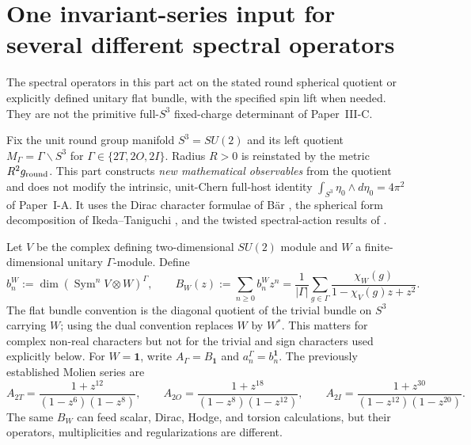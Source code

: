 \documentclass[11pt]{article}
\begin{document}
\section{One invariant-series input for several different spectral operators}
The spectral operators in this part act on the stated round spherical quotient
or explicitly defined unitary flat bundle, with the specified spin lift when
needed.  They are not the primitive full-$S^3$ fixed-charge determinant of
Paper~III-C.
\label{p1b:sec:v13-owners}

Fix the unit round group manifold $S^3=SU(2)$ and its left quotient
$M_\Gamma=\Gamma\backslash S^3$ for
$\Gamma\in\{2T,2O,2I\}$.  Radius $R>0$ is reinstated by the metric
$R^2g_{\rm round}$.  This part constructs \emph{new mathematical
observables} from the quotient and does not modify the intrinsic,
unit-Chern full-host identity
$\int_{S^3}\eta_0\wedge d\eta_0=4\pi^2$ of Paper~I-A.
It uses the Dirac character formulae of B\"ar
\cite{Baer1996DiracSpaceForms,Baer2000SpinStructure}, the spherical
form decomposition of Ikeda--Taniguchi
\cite{ikedaTaniguchi1978eigenforms}, and the twisted spectral-action
results of \cite{CacicMarcolliTeh2014CosmicTopology}.

Let $V$ be the complex defining two-dimensional $SU(2)$ module and
$W$ a finite-dimensional unitary $\Gamma$-module. Define
\begin{equation}
\label{p1b:eq:v13-isotypic-series}
 b_n^W:=\dim(\operatorname{Sym}^n V\otimes W)^\Gamma,
 \qquad B_W(z):=\sum_{n\geq0}b_n^Wz^n
 =\frac1{|\Gamma|}\sum_{g\in\Gamma}
 \frac{\chi_W(g)}{1-\chi_V(g)z+z^2}.
\end{equation}
The flat bundle convention is the diagonal quotient of the trivial
bundle on $S^3$ carrying $W$; using the dual convention replaces $W$
by $W^*$.  This matters for complex non-real characters but not for the
trivial and sign characters used explicitly below.  For $W=\mathbf1$,
write $A_\Gamma=B_{\mathbf1}$ and $a_n^\Gamma=b_n^{\mathbf1}$.
The previously established Molien series are
\begin{equation}
\label{p1b:eq:v13-molien-three}
 A_{2T}=\frac{1+z^{12}}{(1-z^6)(1-z^8)},\qquad
 A_{2O}=\frac{1+z^{18}}{(1-z^8)(1-z^{12})},\qquad
 A_{2I}=\frac{1+z^{30}}{(1-z^{12})(1-z^{20})}.
\end{equation}
The same $B_W$ can feed scalar, Dirac, Hodge, and torsion calculations,
but their operators, multiplicities and regularizations are different.
\end{document}
